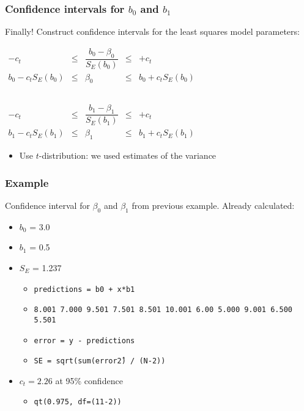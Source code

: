 \begin{frame}\frametitle{Confidence intervals for $b_0$ and $b_1$}
	
	Finally! Construct confidence intervals for the least squares model parameters:
	
	$ 
	\begin{array}{rcccl}
		- c_t &\leq& \dfrac{b_0 - \beta_0}{S_E(b_0)} &\leq & +c_t \\
		b_0 - c_t S_E(b_0) &\leq& \beta_0 &\leq& b_0 + c_t S_E(b_0) 
	\end{array}
	$
	
	$\qquad$
	
	$ 
	\begin{array}{rcccl}
		- c_t &\leq& \dfrac{b_1 - \beta_1}{S_E(b_1)} &\leq & +c_t\\
		b_1 - c_t S_E(b_1) &\leq& \beta_1 &\leq& b_1 + c_t S_E(b_1) 
	\end{array}
	$
	\begin{itemize}
		\item	Use $t$-distribution: we used estimates of the variance 
	\end{itemize}
\end{frame}

\begin{frame}\frametitle{Example}
	
	Confidence interval for $\beta_0$ and $\beta_1$ from previous example. Already calculated: 
	\begin{itemize}
		\item	$b_0$ = 3.0 
		\item	$b_1$ = 0.5 
		\item	$S_E$ = 1.237 
		\begin{itemize}
			\item	\texttt{predictions = b0 + x*b1} 
			\item	\texttt{8.001 7.000 9.501 7.501 8.501 10.001 6.00 5.000 9.001 6.500 5.501} 
			\item	\texttt{error = y - predictions} 
			\item	\texttt{SE = sqrt(sum(error\^ 2) / (N-2))} 
		\end{itemize}
		\item	$c_t = 2.26$ at 95\% confidence 
		\begin{itemize}
			\item	\texttt{qt(0.975, df=(11-2))} 
		\end{itemize}
	\end{itemize}
\end{frame}

